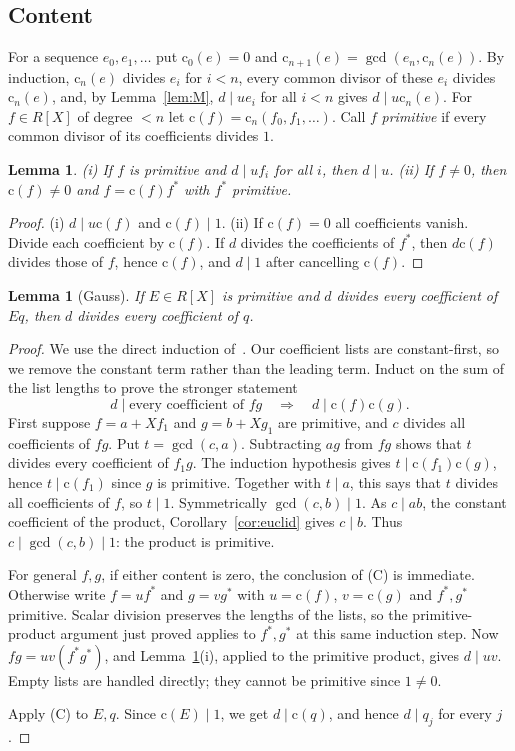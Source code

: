 \documentclass[11pt]{amsart}
\newtheorem{lemma}[theorem]{Lemma}
\theoremstyle{definition}
\theoremstyle{remark}
\newcommand{\gcdop}{\operatorname{gcd}}
\newcommand{\cont}{\mathrm c}
\begin{document}
\subsection*{Content}
For a sequence $e_0,e_1,\dots$ put $\cont_0(e)=0$ and
$\cont_{n+1}(e)=\gcdop(e_n,\cont_n(e))$. By induction, $\cont_n(e)$ divides
$e_i$ for $i<n$, every common divisor of these $e_i$ divides $\cont_n(e)$,
and, by Lemma~\ref{lem:M}, $d\mid ue_i$ for all $i<n$ gives
$d\mid u\cont_n(e)$. For $f\in R[X]$ of degree $<n$ let
$\cont(f)=\cont_n(f_0,f_1,\dots)$. Call $f$ \emph{primitive} if every common
divisor of its coefficients divides $1$.

\begin{lemma}\label{lem:primitive}
(i) If $f$ is primitive and $d\mid uf_i$ for all $i$, then $d\mid u$.
(ii) If $f\ne0$, then $\cont(f)\ne0$ and $f=\cont(f)f^*$ with $f^*$
primitive.
\end{lemma}
\begin{proof}
(i) $d\mid u\cont(f)$ and $\cont(f)\mid1$.
(ii) If $\cont(f)=0$ all coefficients vanish. Divide each coefficient by
$\cont(f)$. If $d$ divides the coefficients of $f^*$, then $d\cont(f)$
divides those of $f$, hence $\cont(f)$, and $d\mid1$ after cancelling
$\cont(f)$.
\end{proof}

\begin{lemma}[Gauss]\label{lem:gauss}
If $E\in R[X]$ is primitive and $d$ divides every coefficient of $Eq$, then
$d$ divides every coefficient of $q$.
\end{lemma}
\begin{proof}
We use the direct induction of~\cite[IV, \S4, Lemma 4.3]{MRR}.
Our coefficient lists are constant-first, so we remove the constant
term rather than the leading term. Induct on the sum of the list lengths
to prove the stronger statement
\[
 d\mid\text{every coefficient of }fg
 \quad\Longrightarrow\quad d\mid\cont(f)\cont(g). \tag{C}
\]
First suppose $f=a+Xf_1$ and $g=b+Xg_1$ are primitive, and $c$ divides
all coefficients of $fg$. Put $t=\gcdop(c,a)$. Subtracting $ag$ from
$fg$ shows that $t$ divides every coefficient of $f_1g$. The induction
hypothesis gives $t\mid\cont(f_1)\cont(g)$, hence
$t\mid\cont(f_1)$ since $g$ is primitive. Together with $t\mid a$,
this says that $t$ divides all coefficients of $f$, so $t\mid1$.
Symmetrically $\gcdop(c,b)\mid1$. As $c\mid ab$, the constant
coefficient of the product, Corollary~\ref{cor:euclid} gives $c\mid b$.
Thus $c\mid\gcdop(c,b)\mid1$: the product is primitive.

For general $f,g$, if either content is zero, the conclusion of (C) is
immediate. Otherwise write $f=uf^*$ and $g=vg^*$ with
$u=\cont(f)$, $v=\cont(g)$ and $f^*,g^*$ primitive. Scalar division
preserves the lengths of the lists, so the primitive-product argument
just proved applies to $f^*,g^*$ at this same induction step. Now
$fg=uv(f^*g^*)$, and Lemma~\ref{lem:primitive}(i), applied to the
primitive product, gives $d\mid uv$. Empty lists are handled directly;
they cannot be primitive since $1\ne0$.

Apply (C) to $E,q$. Since $\cont(E)\mid1$, we get $d\mid\cont(q)$,
and hence $d\mid q_j$ for every $j$.
\end{proof}
\end{document}
